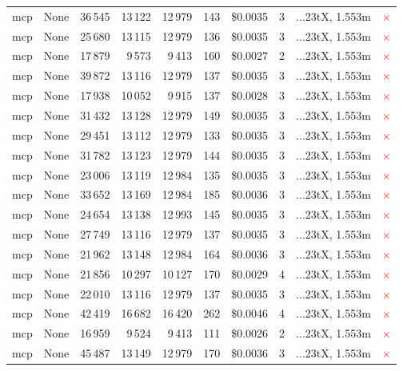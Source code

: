 \documentclass[a4paper,11pt]{article}
\begin{document}
\begin{table}[H]
{\begin{tabular}{l r r r r r r r l c}
mcp & None & 36\,545 & 13\,122 & 12\,979 & 143 & \$0.0035 & 3 & ...23tX, 1.553m & \textcolor{red}{\(\times\)} \\
mcp & None & 25\,680 & 13\,115 & 12\,979 & 136 & \$0.0035 & 3 & ...23tX, 1.553m & \textcolor{red}{\(\times\)} \\
mcp & None & 17\,879 & 9\,573 & 9\,413 & 160 & \$0.0027 & 2 & ...23tX, 1.553m & \textcolor{red}{\(\times\)} \\
mcp & None & 39\,872 & 13\,116 & 12\,979 & 137 & \$0.0035 & 3 & ...23tX, 1.553m & \textcolor{red}{\(\times\)} \\
mcp & None & 17\,938 & 10\,052 & 9\,915 & 137 & \$0.0028 & 3 & ...23tX, 1.553m & \textcolor{red}{\(\times\)} \\
mcp & None & 31\,432 & 13\,128 & 12\,979 & 149 & \$0.0035 & 3 & ...23tX, 1.553m & \textcolor{red}{\(\times\)} \\
mcp & None & 29\,451 & 13\,112 & 12\,979 & 133 & \$0.0035 & 3 & ...23tX, 1.553m & \textcolor{red}{\(\times\)} \\
mcp & None & 31\,782 & 13\,123 & 12\,979 & 144 & \$0.0035 & 3 & ...23tX, 1.553m & \textcolor{red}{\(\times\)} \\
mcp & None & 23\,006 & 13\,119 & 12\,984 & 135 & \$0.0035 & 3 & ...23tX, 1.553m & \textcolor{red}{\(\times\)} \\
mcp & None & 33\,652 & 13\,169 & 12\,984 & 185 & \$0.0036 & 3 & ...23tX, 1.553m & \textcolor{red}{\(\times\)} \\
mcp & None & 24\,654 & 13\,138 & 12\,993 & 145 & \$0.0035 & 3 & ...23tX, 1.553m & \textcolor{red}{\(\times\)} \\
mcp & None & 27\,749 & 13\,116 & 12\,979 & 137 & \$0.0035 & 3 & ...23tX, 1.553m & \textcolor{red}{\(\times\)} \\
mcp & None & 21\,962 & 13\,148 & 12\,984 & 164 & \$0.0036 & 3 & ...23tX, 1.553m & \textcolor{red}{\(\times\)} \\
mcp & None & 21\,856 & 10\,297 & 10\,127 & 170 & \$0.0029 & 4 & ...23tX, 1.553m & \textcolor{red}{\(\times\)} \\
mcp & None & 22\,010 & 13\,116 & 12\,979 & 137 & \$0.0035 & 3 & ...23tX, 1.553m & \textcolor{red}{\(\times\)} \\
mcp & None & 42\,419 & 16\,682 & 16\,420 & 262 & \$0.0046 & 4 & ...23tX, 1.553m & \textcolor{red}{\(\times\)} \\
mcp & None & 16\,959 & 9\,524 & 9\,413 & 111 & \$0.0026 & 2 & ...23tX, 1.553m & \textcolor{red}{\(\times\)} \\
mcp & None & 45\,487 & 13\,149 & 12\,979 & 170 & \$0.0036 & 3 & ...23tX, 1.553m & \textcolor{red}{\(\times\)} \\

\end{tabular}}
\end{table}
\end{document}
